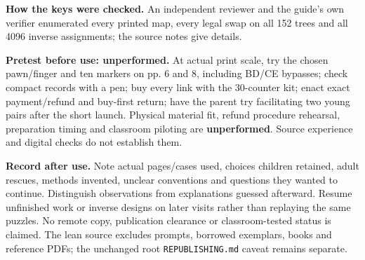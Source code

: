 \documentclass[11pt,letterpaper]{article}
\begin{document}
\textbf{How the keys were checked.} An independent reviewer and the guide's own verifier enumerated every printed map, every legal swap on all 152 trees and all 4096 inverse assignments; the source notes give details.

\textbf{Pretest before use: unperformed.} At actual print scale, try the chosen pawn/finger and ten markers on pp. 6 and 8, including BD/CE bypasses; check compact records with a pen; buy every link with the 30-counter kit; enact exact payment/refund and buy-first return; have the parent try facilitating two young pairs after the short launch. Physical material fit, refund procedure rehearsal, preparation timing and classroom piloting are \textbf{unperformed}. Source experience and digital checks do not establish them.

\textbf{Record after use.} Note actual pages/cases used, choices children retained, adult rescues, methods invented, unclear conventions and questions they wanted to continue. Distinguish observations from explanations guessed afterward. Resume unfinished work or inverse designs on later visits rather than replaying the same puzzles. No remote copy, publication clearance or classroom-tested status is claimed. The lean source excludes prompts, borrowed exemplars, books and reference PDFs; the unchanged root \texttt{REPUBLISHING.md} caveat remains separate.
\end{document}
